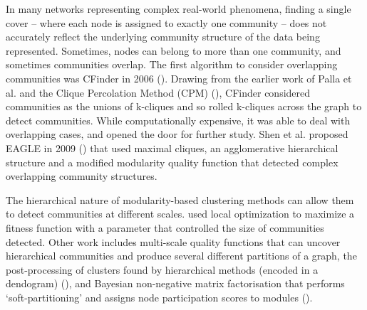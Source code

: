 \documentclass[
11pt, %
english, %
singlespacing, %
headsepline, %
]{MastersDoctoralThesis} %
\begin{document}
In many networks representing complex real-world phenomena, finding a single cover -- where each node is assigned to exactly one community -- does not accurately reflect the underlying community structure of the data being represented. Sometimes, nodes can belong to more than one community, and sometimes communities overlap. The first algorithm to consider overlapping communities was CFinder in 2006 (\cite{adamcsek2006cfinder}). Drawing from the earlier work of Palla et al. and the Clique Percolation Method (CPM) (\cite{palla2005uncovering}), CFinder considered communities as the unions of k-cliques and so rolled k-cliques across the graph to detect communities. While computationally expensive, it was able to deal with overlapping cases, and opened the door for further study. Shen et al. proposed EAGLE in 2009 (\cite{shen2009detect}) that used maximal cliques, an agglomerative hierarchical structure and a modified modularity quality function that detected complex overlapping community structures.

The hierarchical nature of modularity-based clustering methods can allow them to detect communities at different scales. 
\cite{lancichinetti2009detecting} used local optimization to maximize a fitness function with a parameter that controlled the size of communities detected.
Other work includes multi-scale quality functions that can uncover hierarchical communities and produce several different partitions of a graph, the post-processing of clusters found by hierarchical methods (encoded in a dendogram) (\cite{pons2011post}), and Bayesian non-negative matrix factorisation that performs `soft-partitioning' and assigns node participation scores to modules (\cite{psorakis2011overlapping}).


\end{document}
